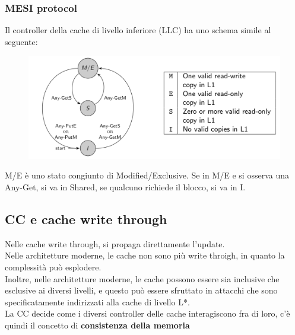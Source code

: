\documentclass[12pt, oneside]{extbook} %
\begin{document}
\subsubsection{MESI protocol}
Il controller della cache di livello inferiore (LLC) ha uno schema simile al seguente:\\ 
\begin{figure}
	\includegraphics[scale=0.3]{immagini/llc_mesi.png}
\end{figure}
M/E è uno stato congiunto di Modified/Exclusive. Se in M/E e si osserva una Any-Get, si va in Shared, se qualcuno richiede il blocco, si va in I.

\subsection{CC e cache write through}
Nelle cache write through, si propaga direttamente l'update.\\Nelle architetture moderne, le cache non sono più write throigh, in quanto la complessità può esplodere.\\Inoltre, nelle architetture moderne, le cache possono essere sia inclusive che esclusive ai diversi livelli, e questo può essere sfruttato in attacchi che sono specificatamente indirizzati alla cache di livello L*.\\La CC decide come i diversi controller delle cache interagiscono fra di loro, c'è quindi il concetto di \textbf{consistenza della memoria}
\end{document}
